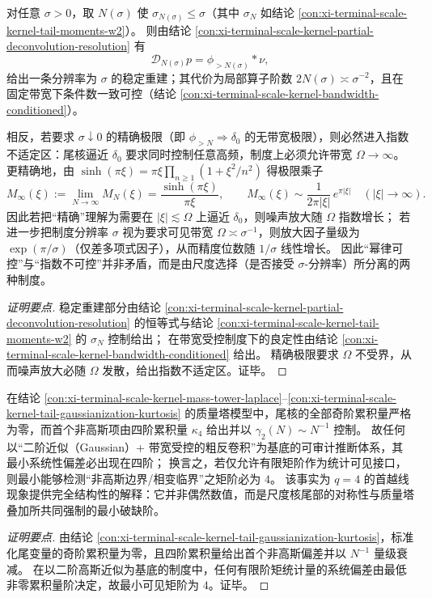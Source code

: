 \begin{conclusion}\label{con:xi-terminal-scale-kernel-two-regime-recoverability}
对任意 \(\sigma>0\)，取 \(N(\sigma)\) 使 \(\sigma_{N(\sigma)}\le\sigma\)（其中 \(\sigma_N\) 如结论 \ref{con:xi-terminal-scale-kernel-tail-moments-w2}）。
则由结论 \ref{con:xi-terminal-scale-kernel-partial-deconvolution-resolution} 有
\[
\mathcal D_{N(\sigma)}p=\phi_{>N(\sigma)}*\nu,
\]
给出一条分辨率为 \(\sigma\) 的稳定重建；其代价为局部算子阶数 \(2N(\sigma)\asymp\sigma^{-2}\)，且在固定带宽下条件数一致可控（结论 \ref{con:xi-terminal-scale-kernel-bandwidth-conditioned}）。
\par
相反，若要求 \(\sigma\downarrow 0\) 的精确极限（即 \(\phi_{>N}\Rightarrow\delta_0\) 的无带宽极限），则必然进入指数不适定区：尾核逼近 \(\delta_0\) 要求同时控制任意高频，制度上必须允许带宽 \(\Omega\to\infty\)。
更精确地，由 \(\sinh(\pi\xi)=\pi\xi\prod_{n\ge 1}(1+\xi^2/n^2)\) 得极限乘子
\[
M_\infty(\xi):=\lim_{N\to\infty}M_N(\xi)=\frac{\sinh(\pi\xi)}{\pi\xi},
\qquad
M_\infty(\xi)\sim \frac{1}{2\pi|\xi|}\,e^{\pi|\xi|}\quad(|\xi|\to\infty).
\]
因此若把“精确”理解为需要在 \(|\xi|\lesssim \Omega\) 上逼近 \(\delta_0\)，则噪声放大随 \(\Omega\) 指数增长；
若进一步把制度分辨率 \(\sigma\) 视为要求可见带宽 \(\Omega\asymp \sigma^{-1}\)，则放大因子量级为 \(\exp(\pi/\sigma)\)（仅差多项式因子），从而精度位数随 \(1/\sigma\) 线性增长。
因此“幂律可控”与“指数不可控”并非矛盾，而是由尺度选择（是否接受 \(\sigma\)-分辨率）所分离的两种制度。
\end{conclusion}
\begin{proof}[证明要点]
稳定重建部分由结论 \ref{con:xi-terminal-scale-kernel-partial-deconvolution-resolution} 的恒等式与结论 \ref{con:xi-terminal-scale-kernel-tail-moments-w2} 的 \(\sigma_N\) 控制给出；
在带宽受控制度下的良定性由结论 \ref{con:xi-terminal-scale-kernel-bandwidth-conditioned} 给出。
精确极限要求 \(\Omega\) 不受界，从而噪声放大必随 \(\Omega\) 发散，给出指数不适定区。证毕。
\end{proof}

\begin{conclusion}[\texorpdfstring{$(q=4)$}{(q=4)} 的正则化地位：四阶破缺决定可见相变的最小矩阶]\label{con:xi-terminal-scale-kernel-q4-minimal-visible-order}
在结论 \ref{con:xi-terminal-scale-kernel-mass-tower-laplace}--\ref{con:xi-terminal-scale-kernel-tail-gaussianization-kurtosis} 的质量塔模型中，尾核的全部奇阶累积量严格为零，而首个非高斯项由四阶累积量 \(\kappa_4\) 给出并以
\(\gamma_2(N)\sim N^{-1}\)
控制。
故任何以“二阶近似（Gaussian）+ 带宽受控的粗反卷积”为基底的可审计推断体系，其最小系统性偏差必出现在四阶；
换言之，若仅允许有限矩阶作为统计可见接口，则最小能够检测“非高斯边界/相变临界”之矩阶必为 \(4\)。
该事实为 \(q=4\) 的首越线现象提供完全结构性的解释：它并非偶然数值，而是尺度核尾部的对称性与质量塔叠加所共同强制的最小破缺阶。
\end{conclusion}
\begin{proof}[证明要点]
由结论 \ref{con:xi-terminal-scale-kernel-tail-gaussianization-kurtosis}，标准化尾变量的奇阶累积量为零，且四阶累积量给出首个非高斯偏差并以 \(N^{-1}\) 量级衰减。
在以二阶高斯近似为基底的制度中，任何有限阶矩统计量的系统偏差由最低非零累积量阶决定，故最小可见矩阶为 \(4\)。证毕。
\end{proof}


